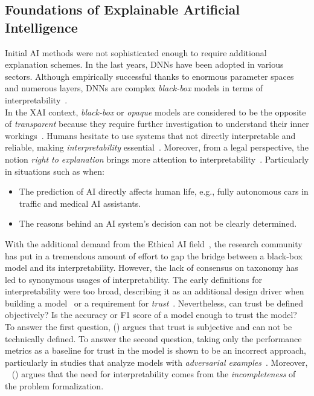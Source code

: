 \subsection{Foundations of Explainable Artificial Intelligence}
\label{subsec:explainableArtificialIntelligence_Foundations}
Initial AI methods were not sophisticated enough to require additional explanation schemes. In the last years, DNNs have been adopted in various sectors. Although empirically successful thanks to enormous parameter spaces and numerous layers, DNNs are complex \emph{black-box} models in terms of interpretability~\parencite{CanWeOpenTheBlackBoxOfAI_Castelvecchi}.\\
In the XAI context, \emph{black-box} or \emph{opaque} models are considered to be the opposite of \emph{transparent} because they require further investigation to understand their inner workings~\parencite{TheMythosOfModelInterpretability_Lipton}. Humans hesitate to use systems that not directly interpretable and reliable, making \emph{interpretability} essential~\parencite{xAIForDesigners_Zhu}. Moreover, from a legal perspective, the notion \emph{right to explanation} brings more attention to interpretability~\parencite{TheMythosOfModelInterpretability_Lipton}. Particularly in situations such as when:
\begin{itemize}
    \item The prediction of AI directly affects human life, e.g., fully autonomous cars in traffic and medical AI assistants.
    \item The reasons behind an AI system’s decision can not be clearly determined.
\end{itemize}
With the additional demand from the Ethical AI field~\parencite{EURegulationsOnDecisionMaking_Goodman}, the research community has put in a tremendous amount of effort to gap the bridge between a black-box model and its interpretability. However, the lack of consensus on taxonomy has led to synonymous usages of interpretability. The early definitions for interpretability were too broad, describing it as an additional design driver when building a model~\parencite{TheBayesianCaseModel_Kim} or a requirement for \emph{trust}~\parencite{InteractiveAndInterpretableMLModels_Kim}. Nevertheless, can trust be defined objectively? Is the accuracy or F1 score of a model enough to trust the model? To answer the first question, \citeauthor{TheMythosOfModelInterpretability_Lipton} (\citeyear{TheMythosOfModelInterpretability_Lipton}) argues that trust is subjective and can not be technically defined. To answer the second question, taking only the performance metrics as a baseline for trust in the model is shown to be an incorrect approach, particularly in studies that analyze models with \emph{adversarial examples}~\parencite{DetectingAdversarilaImageExamples_Bin, AdversarialExamples_Yuan}. Moreover, ~\citeauthor{TowardsARigorousScienceML_Velez} (\citeyear{TowardsARigorousScienceML_Velez}) argues that the need for interpretability comes from the \emph{incompleteness} of the problem formalization.\\
